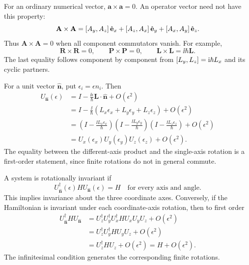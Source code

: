 For an ordinary numerical vector, $\mathbf a\times\mathbf a=0$.
An operator vector need not have this property:
\[
 \mathbf A\times\mathbf A
 =\left[A_y,A_z\right]\hat{\mathbf e}_x
 +\left[A_z,A_x\right]\hat{\mathbf e}_y
 +\left[A_x,A_y\right]\hat{\mathbf e}_z.
\]
Thus $\mathbf A\times\mathbf A=0$ when all component commutators vanish.
For example,
\[
 \mathbf R\times\mathbf R=0,\qquad
 \mathbf P\times\mathbf P=0,\qquad
 \mathbf L\times\mathbf L=\ii\hbar\mathbf L.
\]
The last equality follows component by component from
$\left[L_y,L_z\right]=\mathrm{i}\hbar L_x$ and its cyclic partners.

For a unit vector $\hat{\mathbf n}$, put
$\epsilon_i=\epsilon n_i$. Then
\begin{align*}
 U_{\hat{\mathbf n}}(\epsilon)
 &=I-\frac{\ii\epsilon}{\hbar}\mathbf L\cdot\hat{\mathbf n}
   +O(\epsilon^2)\\
 &=I-\frac{\ii}{\hbar}(L_x\epsilon_x+L_y\epsilon_y+L_z\epsilon_z)
   +O(\epsilon^2)\\
 &=\left(I-\frac{\ii L_x\epsilon_x}{\hbar}\right)
   \left(I-\frac{\ii L_y\epsilon_y}{\hbar}\right)
   \left(I-\frac{\ii L_z\epsilon_z}{\hbar}\right)+O(\epsilon^2)\\
 &=U_x(\epsilon_x)U_y(\epsilon_y)U_z(\epsilon_z)+O(\epsilon^2).
\end{align*}
The equality between the different-axis product and the single-axis
rotation is a first-order statement, since finite rotations do not in
general commute.

A system is rotationally invariant if
\[
 U_{\hat{\mathbf n}}^\dagger(\epsilon)HU_{\hat{\mathbf n}}(\epsilon)=H
 \quad\text{for every axis and angle}.
\]
This implies invariance about the three coordinate axes. Conversely,
if the Hamiltonian is invariant under each coordinate-axis rotation,
then to first order
\begin{align*}
 U_{\hat{\mathbf n}}^\dagger H U_{\hat{\mathbf n}}
 &=U_z^\dagger U_y^\dagger U_x^\dagger H U_xU_yU_z+O(\epsilon^2)\\
 &=U_z^\dagger U_y^\dagger H U_yU_z+O(\epsilon^2)\\
 &=U_z^\dagger H U_z+O(\epsilon^2)=H+O(\epsilon^2).
\end{align*}
The infinitesimal condition generates the corresponding finite rotations.
